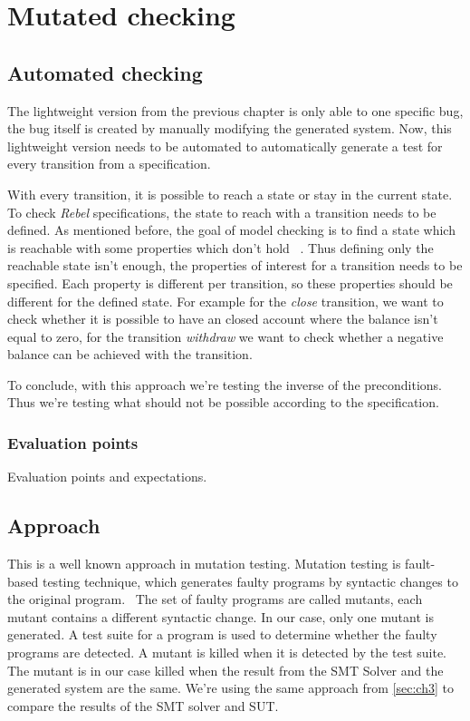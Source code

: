 \chapter{Mutated checking}\label{sec:ch4}


\section{Automated checking}

The lightweight version from the previous chapter is only able to one specific
bug, the bug itself is created by manually modifying the generated system. Now,
this lightweight version needs to be automated to automatically generate a test
for every transition from a specification.

With every transition, it is possible to reach a state or stay in the current
state. To check \textit{Rebel} specifications, the state to reach with a transition needs
to be defined. As mentioned before, the goal of model checking is to find a
state which is reachable with some properties which don't hold
~\cite[p.5]{stoel_storm_vinju_bosman_2016}. Thus defining only the reachable
state isn't enough, the properties of interest for a transition needs to be
specified. Each property is different per transition, so these properties should
be different for the defined state. For example for the \textit{close}
transition, we want to check whether it is possible to have an closed account
where the balance isn't equal to zero, for the transition \textit{withdraw} we
want to check whether a negative balance can be achieved with the transition.

To conclude, with this approach we're testing the inverse of the preconditions. Thus we're testing
what should not be possible according to the specification.

\subsection{Evaluation points}
Evaluation points and expectations.

\section{Approach}
This is a well known approach in mutation testing. Mutation testing is
fault-based testing technique, which generates faulty programs by syntactic
changes to the original program.~\cite[p.~1]{jia2011analysis} The set of faulty
programs are called mutants, each mutant contains a different syntactic change.
In our case, only one mutant is generated. A test suite for a program is used to
determine whether the faulty programs are detected. A mutant is killed when it
is detected by the test suite. The mutant is in our case killed when the result
from the SMT Solver and the generated system are the same. We're using the same
approach from \autoref{sec:ch3} to compare the results of the SMT solver and
SUT.

